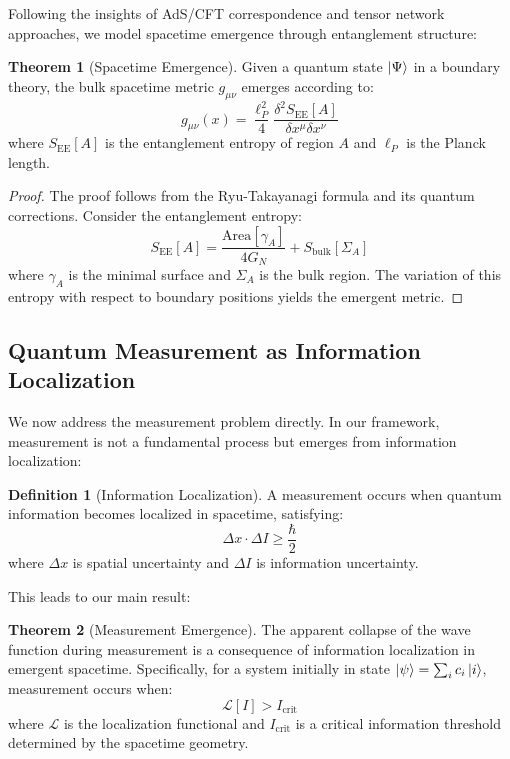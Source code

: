\documentclass[12pt,a4paper]{article}
\theoremstyle{definition}
\newtheorem{definition}{Definition}[section]
\newtheorem{theorem}{Theorem}[section]
\begin{document}
Following the insights of AdS/CFT correspondence and tensor network approaches, we model spacetime emergence through entanglement structure:

\begin{theorem}[Spacetime Emergence]
Given a quantum state $\ket{\Psi}$ in a boundary theory, the bulk spacetime metric $g_{\mu\nu}$ emerges according to:
\begin{equation}
g_{\mu\nu}(x) = \frac{\ell_P^2}{4} \frac{\delta^2 S_{\text{EE}}[A]}{\delta x^\mu \delta x^\nu}
\end{equation}
where $S_{\text{EE}}[A]$ is the entanglement entropy of region $A$ and $\ell_P$ is the Planck length.
\end{theorem}

\begin{proof}
The proof follows from the Ryu-Takayanagi formula and its quantum corrections. Consider the entanglement entropy:
\begin{equation}
S_{\text{EE}}[A] = \frac{\text{Area}[\gamma_A]}{4G_N} + S_{\text{bulk}}[\Sigma_A]
\end{equation}
where $\gamma_A$ is the minimal surface and $\Sigma_A$ is the bulk region. The variation of this entropy with respect to boundary positions yields the emergent metric.
\end{proof}

\subsection{Quantum Measurement as Information Localization}

We now address the measurement problem directly. In our framework, measurement is not a fundamental process but emerges from information localization:

\begin{definition}[Information Localization]
A measurement occurs when quantum information becomes localized in spacetime, satisfying:
\begin{equation}
\Delta x \cdot \Delta I \geq \frac{\hbar}{2}
\end{equation}
where $\Delta x$ is spatial uncertainty and $\Delta I$ is information uncertainty.
\end{definition}

This leads to our main result:

\begin{theorem}[Measurement Emergence]
The apparent collapse of the wave function during measurement is a consequence of information localization in emergent spacetime. Specifically, for a system initially in state $\ket{\psi} = \sum_i c_i \ket{i}$, measurement occurs when:
\begin{equation}
\mathcal{L}[I] > I_{\text{crit}}
\end{equation}
where $\mathcal{L}$ is the localization functional and $I_{\text{crit}}$ is a critical information threshold determined by the spacetime geometry.
\end{theorem}
\end{document}
